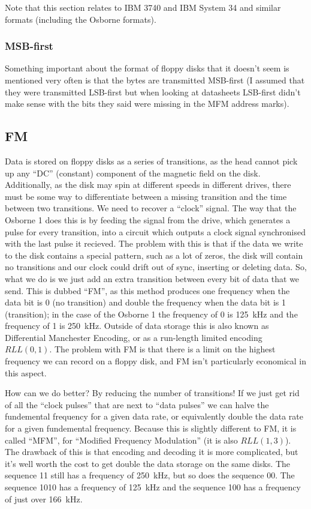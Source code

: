 \documentclass[a4paper]{article}
\begin{document}
Note that this section relates to IBM 3740 and IBM System 34 and
similar formats (including the Osborne formats).

\subsubsection{MSB-first}

Something important about the format of floppy disks that it doesn't
seem is mentioned very often is that the bytes are transmitted
MSB-first (I assumed that they were transmitted LSB-first but when
looking at datasheets LSB-first didn't make sense with the bits they
said were missing in the MFM address marks).

\subsection{FM}

Data is stored on floppy disks as a series of transitions, as the head
cannot pick up any ``DC'' (constant) component of the magnetic field
on the disk. Additionally, as the disk may spin at different speeds in
different drives, there must be some way to differentiate between a
missing transition and the time between two transitions. We need to
recover a ``clock'' signal. The way that the Osborne 1 does this is by
feeding the signal from the drive, which generates a pulse for every
transition, into a circuit which outputs a clock signal synchronised
with the last pulse it recieved. The problem with this is that if the
data we write to the disk contains a special pattern, such as a lot of
zeros, the disk will contain no transitions and our clock could drift
out of sync, inserting or deleting data. So, what we do is we just add
an extra transition between every bit of data that we send. This is
dubbed ``FM'', as this method produces one frequency when the data bit
is 0 (no transition) and double the frequency when the data bit is 1
(transition); in the case of the Osborne 1 the frequency of 0 is
\qty{125}{\kHz} and the frequency of 1 is \qty{250}{\kHz}. Outside of
data storage this is also known as Differential Manchester Encoding,
or as a run-length limited encoding \(RLL \left(0,1\right)\). The
problem with FM is that there is a limit on the highest frequency we
can record on a floppy disk, and FM isn't particularly economical in
this aspect.

How can we do better? By reducing the number of transitions! If we
just get rid of all the ``clock pulses'' that are next to ``data
pulses'' we can halve the fundemental frequency for a given data rate,
or equivalently double the data rate for a given fundemental
frequency. Because this is slightly different to FM, it is called
``MFM'', for ``Modified Frequency Modulation'' (it is also \(RLL
\left(1,3\right)\)). The drawback of this is that encoding and
decoding it is more complicated, but it's well worth the cost to get
double the data storage on the same disks. The sequence 11 still has a
frequency of \qty{250}{\kHz}, but so does the sequence 00. The
sequence 1010 has a frequency of \qty{125}{\kHz} and the sequence 100
has a frequency of just over \qty{166}{\kHz}.
\end{document}
